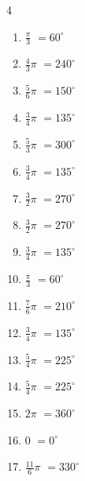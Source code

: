 \begin{multicols}{4}
\begin{enumerate}
  \item $\displaystyle \frac{\pi}{3}$
        $\displaystyle =60^{\circ}$

  \item $\displaystyle \frac{4}{3}\pi$
        $\displaystyle =240^{\circ}$

  \item $\displaystyle \frac{5}{6}\pi$
        $\displaystyle =150^{\circ}$

  \item $\displaystyle \frac{3}{4}\pi$
        $\displaystyle =135^{\circ}$

  \item $\displaystyle \frac{5}{3}\pi$
        $\displaystyle =300^{\circ}$

  \item $\displaystyle \frac{3}{4}\pi$
        $\displaystyle =135^{\circ}$

\columnbreak %

  \item $\displaystyle \frac{3}{2}\pi$
        $\displaystyle =270^{\circ}$

  \item $\displaystyle \frac{3}{2}\pi$
        $\displaystyle =270^{\circ}$

  \item $\displaystyle \frac{3}{4}\pi$
        $\displaystyle =135^{\circ}$

  \item $\displaystyle \frac{\pi}{3}$
        $\displaystyle =60^{\circ}$

  \item $\displaystyle \frac{7}{6}\pi$
        $\displaystyle =210^{\circ}$

  \item $\displaystyle \frac{3}{4}\pi$
        $\displaystyle =135^{\circ}$

  \item $\displaystyle \frac{5}{4}\pi$
        $\displaystyle =225^{\circ}$

  \item $\displaystyle \frac{5}{4}\pi$
        $\displaystyle =225^{\circ}$

  \item $\displaystyle 2\pi$
        $\displaystyle =360^{\circ}$

  \item $\displaystyle 0$
        $\displaystyle =0^{\circ}$

  \item $\displaystyle \frac{11}{6}\pi$
        $\displaystyle =330^{\circ}$


\end{enumerate}
\end{multicols}
